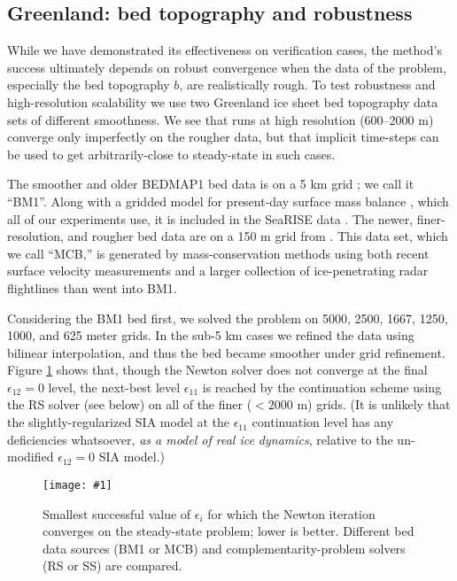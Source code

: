 \documentclass[review,letterpaper]{igs}
\newcommand{\onecol}[1]{\texttt{[image: \#1]}}
\newcommand\eps{\epsilon}
\begin{document}
\subsection{Greenland: bed topography and robustness}

While we have demonstrated its effectiveness on verification cases, the method's success ultimately depends on robust convergence when the data of the problem, especially the bed topography $b$, are realistically rough.  To test robustness and high-resolution scalability we use two Greenland ice sheet bed topography data sets of different smoothness.  We see that runs at high resolution (600--2000 m) converge only imperfectly on the rougher data, but that implicit time-steps can be used to get arbitrarily-close to steady-state in such cases.

\newcommand{\BM}{\textsf{BM1}\xspace}
\newcommand{\MCB}{\textsf{MCB}\xspace}
\newcommand{\virs}{\textsf{RS}\xspace}
\newcommand{\viss}{\textsf{SS}\xspace}

The smoother and older BEDMAP1 bed data is on a 5 km grid \citep{Bamberetal2001}; we call it ``\BM''.  Along with a gridded model for present-day surface mass balance \citep{Ettemaetal2009}, which all of our experiments use, it is included in the SeaRISE data \citep{Bindschadleretal2013}.  The newer, finer-resolution, and rougher bed data are on a 150 m grid from \cite{Morlighemetal2014}.  This data set, which we call ``\MCB,'' is generated by mass-conservation methods using both recent surface velocity measurements and a larger collection of ice-penetrating radar flightlines than went into \BM.

Considering the \BM bed first, we solved the problem on 5000, 2500, 1667, 1250, 1000, and 625 meter grids.  In the sub-5 km cases we refined the data using bilinear interpolation, and thus the bed became smoother under grid refinement.  Figure \ref{fig:grnrobusteps} shows that, though the Newton solver does not converge at the final $\eps_{12}=0$ level, the next-best level $\eps_{11}$ is reached by the continuation scheme using the \virs solver (see below) on all of the finer ($<2000$ m) grids.  (It is unlikely that the slightly-regularized SIA model at the $\eps_{11}$ continuation level has any deficiencies whatsoever, \emph{as a model of real ice dynamics}, relative to the un-modified $\eps_{12}=0$ SIA model.)

\begin{figure}[ht]
\onecol{grnrobusteps.pdf}
\caption{Smallest successful value of $\eps_i$ for which the Newton iteration converges on the steady-state problem; lower is better.  Different bed data sources (\BM or \MCB) and complementarity-problem solvers (\virs or \viss) are compared.}
\label{fig:grnrobusteps}
\end{figure}
\end{document}
